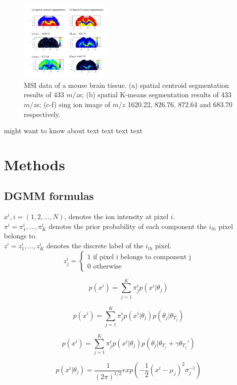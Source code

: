 \documentclass{bioinfo}
\begin{document}
\begin{figure}[b!]
    \centering
	\includegraphics[width=0.4\textwidth]{figure1.jpg}
    \caption{ MSI data of a mouse brain tissue. (a) spatial centroid segmentation results of 433 $m/z$s; (b) spatial K-means segmentation results of 433 $m/z$s; (c-f) sing ion image of $m/z$ 1620.22, 826.76, 872.64 and 683.70 respectively.}
    \label{fig:figure1}
\end{figure}
\citealp{Boffelli03} might want to know about text text text
text\vspace*{1pt}





\section{Methods}
\subsection{DGMM formulas}
$x^i, i = (1,2,...,N)$, denotes the ion intensity at pixel $i$.\\
$\pi^i={\pi^i_1,..., \pi^i_K}$ denotes the prior probability of each component the $i_{th}$ pixel belongs to.\\
$z^i={z^i_1,...,z^i_K}$ denotes the discrete label of the $i_{th}$ pixel.\\
$$z^i_j=\left\{\begin{matrix}
1 \textrm{ if pixel i belongs to component j}\\ 
0 \textrm{ otherwise} 

\end{matrix}\right.$$

$$p(x^i)=\sum_{j=1}^{K}\pi^i_jp(x^i|\theta_j)$$

$$p(x^i)=\sum_{j=1}^{K}\pi^i_jp(x^i|\theta_j)p(\theta_j|\theta_{T_j})$$

$$p(x^i)=\sum_{j=1}^{K}\pi^i_jp(x^i|\theta_j)p(\theta_j|\theta_{T_j}+\gamma \theta_{T_j}')$$

$$p(x^i|\theta_j)=\frac{1}{(2\pi)^{1/2}}exp(-\frac{1}{2}(x^i-\mu_j)^2\sigma_j^{-1})$$
\end{document}
